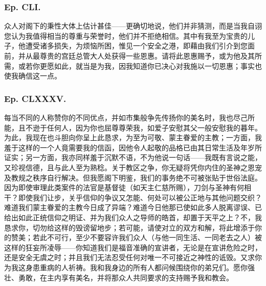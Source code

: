 \subsubsection{Ep. CLI.}

\par

众人对阁下的秉性大体上估计甚佳——更确切地说，他们并非猜测，而是当我自诩您认为我值得相当的尊重与荣誉时，他们并不拒绝相信。其中有我至为宝贵的儿子，他遭受诸多损失，为烦恼所困，惟见一个安全之港，即藉由我们引介到您面前，并从最尊贵的宫廷总管大人处获得一些恩惠。请将此恩惠赐予，或为他及其所需，或若你更愿如此，就当是为我，因我知道你已决心对我施以一切恩惠；事实也使我确信这一点。\par


\subsubsection{Ep. CLXXXV.}

\par

每当不同的人称赞你的不同优点，并如市集般争先传扬你的美名时，我也尽己所能，且不逊于任何人，因为你也屈尊尊荣我，如爱子安慰其父一般安慰我的暮年。为此，我现在也斗胆向你呈上此恳求，为至为可敬、蒙主眷爱的主教；一方面，我羞于这样的一个人竟需要我的信函，因他令人起敬的品格已由其日常生活及年岁所证实；另一方面，我亦同样羞于沉默不语，不为他说一句话——我既有言说之能，又珍视信德，且与此人至为熟稔。关于教区之争，你无疑将凭你内住的圣神之恩宠及教规之秩序自行解决。但我愿阁下明鉴，我们的事务绝不可被张贴于世俗法庭。因为即使审理此类案件的法官是基督徒（如天主仁慈所赐），刀剑与圣神有何相干？即使我们让步，关乎信仰的争议又怎能、何处可以被公正地与其他问题交织？难道我们蒙主眷爱的主教今日成了异端？难道今日他那已使如此多人脱离谬误、已给出如此正统信仰之明证、并为我们众人之导师的皓首，却置于天平之上？不，我恳求你，切勿给这样的毁谤留地步；若可能，请使对立的双方和解，将此增添于你的赞美；若此不可行，至少不要容许我们众人（与他一同生活、一同老去之人）被这样的狂妄所凌辱——你知道我们是福音准确的宣讲者，无论是在宣讲危险之时，还是安全无虞之时；并且我们无法忍受任何对唯一不可接近之神性的诋毁。又求你为我这身患重病的人祈祷。我和我身边的所有人都问候围绕你的弟兄们。愿你强壮、勇敢，在主内享有美名，并将那众人共同要求的支持赐予我和教会。\par

